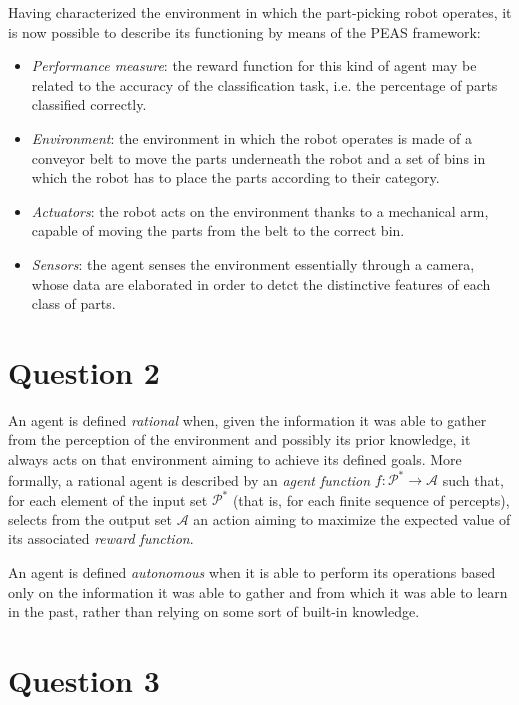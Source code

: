 \documentclass[letterpaper,headings=standardclasses]{scrartcl}
\begin{document}
Having characterized the environment in which the part-picking robot operates, it is now possible to describe its functioning by means of the PEAS framework:

\begin{itemize}

\item \emph{Performance measure}: the reward function for this kind of agent may be related to the accuracy of the classification task, i.e. the percentage of parts classified correctly.

\item \emph{Environment}: the environment in which the robot operates is made of a conveyor belt to move the parts underneath the robot and a set of bins in which the robot has to place the parts according to their category.

\item \emph{Actuators}: the robot acts on the environment thanks to a mechanical arm, capable of moving the parts from the belt to the correct bin.

\item \emph{Sensors}: the agent senses the environment essentially through a camera, whose data are elaborated in order to detct the distinctive features of each class of parts.

\end{itemize}

\section{Question 2}

An agent is defined \emph{rational} when, given the information it was able to gather from the perception of the environment and possibly its prior knowledge, it always acts on that environment aiming to achieve its defined goals. More formally, a rational agent is described by an \emph{agent function} $ f : \mathcal{P}^* \rightarrow \mathcal{A} $ such that, for each element of the input set $ \mathcal{P}^* $ (that is, for each finite sequence of percepts), selects from the output set $ \mathcal{A} $ an action aiming to maximize the expected value of its associated \emph{reward function}.

An agent is defined \emph{autonomous} when it is able to perform its operations based only on the information it was able to gather and from which it was able to learn in the past, rather than relying on some sort of built-in knowledge.

\section{Question 3}
\end{document}
